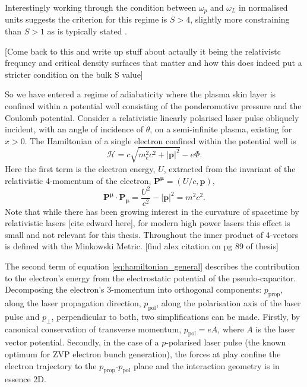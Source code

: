 Interestingly working through the condition between $\omega_p$ and $\omega_L$ in normalised units suggests the criterion for this regime is $S > 4$, slightly more constraining than $S>1$ as is typically stated \cite{savin2019thesis}.




[Come back to this and write up stuff about actaully it being the relativistc frequncy and critical density surfaces that matter and how this does indeed put a stricter condition on the bulk S value]

So we have entered a regime of adiabaticity where the plasma skin layer is confined within a potential well consisting of the ponderomotive pressure and the Coulomb potential. Consider a relativistic linearly polarised laser pulse obliquely incident, with an angle of incidence of $\theta$, on a semi-infinite plasma, existing for $x>0$. The Hamiltonian of a single electron confined within the potential well \cite{herbert_classical_mechanics} is
\begin{equation}\label{eq:hamiltonian_general}
	\mathcal{H} = c\sqrt{m^2_ec^2 + |\mathbf{p}|^2} - e\Phi.
\end{equation}
Here the first term is the electron energy, $U$, extracted from the invariant of the relativistic 4-momentum of the electron, $\mathbf{P^\mu} = (U/c, \mathbf{p})$,
\begin{equation}
	\mathbf{P^\mu \cdot P_\mu} = \frac{U^2}{c^2} - |\mathbf{p}|^2 = m^2c^2.
\end{equation}
Note that while there has been growing interest in the curvature of spacetime by relativistic lasers [cite edward here], for modern high power lasers this effect is small and not relevant for this thesis. Throughout the inner product of 4-vectors is defined with the Minkowski Metric. [find alex citation on pg 89 of thesis]

The second term of equation \ref{eq:hamiltonian_general} describes the contribution to the electron's energy from the electrostatic potential of the pseudo-capacitor. Decomposing the electron's 3-momentum into orthogonal components: $p_\mathrm{prop}$, along the laser propagation direction, $p_\mathrm{pol}$, along the polarisation axis of the laser pulse and $p_\perp$, perpendicular to both, two simplifications can be made. Firstly, by canonical conservation of transverse momentum, $p_\mathrm{pol} = eA$, where $A$ is the laser vector potential. Secondly, in the case of a $p$-polarised laser pulse (the known optimum for ZVP electron bunch generation), the forces at play confine the electron trajectory to the  $p_\mathrm{prop}$-$p_\mathrm{pol}$ plane and the interaction geometry is in essence \ac{2D}.

